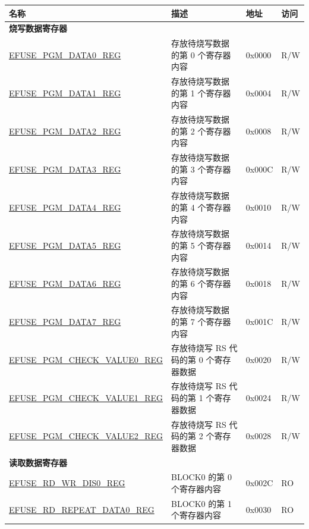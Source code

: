 \begin{longtable}{ | p{6.8cm} | p{7cm} | p{1.3cm} | p{1.2cm} | }
    \hline\rowcolor{lightgray}
    名称 & 描述 &  地址 & 访问 \\ \hline
    \endhead
    \multicolumn{4}{|l|}{\textbf{烧写数据寄存器}} \\ \hline
    \hyperref[regdesc:EFUSEPGMDATANREG]{EFUSE\_PGM\_DATA0\_REG} & 存放待烧写数据的第 0 个寄存器内容 & 0x0000 & R/W \\ \hline
    \hyperref[regdesc:EFUSEPGMDATANREG]{EFUSE\_PGM\_DATA1\_REG} & 存放待烧写数据的第 1 个寄存器内容 & 0x0004 & R/W \\ \hline
    \hyperref[regdesc:EFUSEPGMDATANREG]{EFUSE\_PGM\_DATA2\_REG} & 存放待烧写数据的第 2 个寄存器内容 & 0x0008 & R/W \\ \hline
    \hyperref[regdesc:EFUSEPGMDATANREG]{EFUSE\_PGM\_DATA3\_REG} & 存放待烧写数据的第 3 个寄存器内容 & 0x000C & R/W \\ \hline
    \hyperref[regdesc:EFUSEPGMDATANREG]{EFUSE\_PGM\_DATA4\_REG} & 存放待烧写数据的第 4 个寄存器内容 & 0x0010 & R/W \\ \hline
    \hyperref[regdesc:EFUSEPGMDATANREG]{EFUSE\_PGM\_DATA5\_REG} & 存放待烧写数据的第 5 个寄存器内容 & 0x0014 & R/W \\ \hline
    \hyperref[regdesc:EFUSEPGMDATANREG]{EFUSE\_PGM\_DATA6\_REG} & 存放待烧写数据的第 6 个寄存器内容 & 0x0018 & R/W \\ \hline
    \hyperref[regdesc:EFUSEPGMDATANREG]{EFUSE\_PGM\_DATA7\_REG} & 存放待烧写数据的第 7 个寄存器内容 & 0x001C & R/W \\ \hline
    \hyperref[regdesc:EFUSEPGMCHECKVALUENREG]{EFUSE\_PGM\_CHECK\_VALUE0\_REG} & 存放待烧写 RS 代码的第 0 个寄存器数据 & 0x0020 & R/W \\ \hline
    \hyperref[regdesc:EFUSEPGMCHECKVALUENREG]{EFUSE\_PGM\_CHECK\_VALUE1\_REG} & 存放待烧写 RS 代码的第 1 个寄存器数据 & 0x0024 & R/W \\ \hline
    \hyperref[regdesc:EFUSEPGMCHECKVALUENREG]{EFUSE\_PGM\_CHECK\_VALUE2\_REG} & 存放待烧写 RS 代码的第 2 个寄存器数据 & 0x0028 & R/W \\ \hline
    \multicolumn{4}{|l|}{\textbf{读取数据寄存器}} \\ \hline
    \hyperref[regdesc:EFUSERDWRDIS0REG]{EFUSE\_RD\_WR\_DIS0\_REG} & BLOCK0 的第 0 个寄存器内容 & 0x002C & RO \\ \hline
    \hyperref[regdesc:EFUSERDREPEATDATA0REG]{EFUSE\_RD\_REPEAT\_DATA0\_REG} & BLOCK0 的第 1 个寄存器内容 & 0x0030 & RO \\ \hline

\end{longtable}
